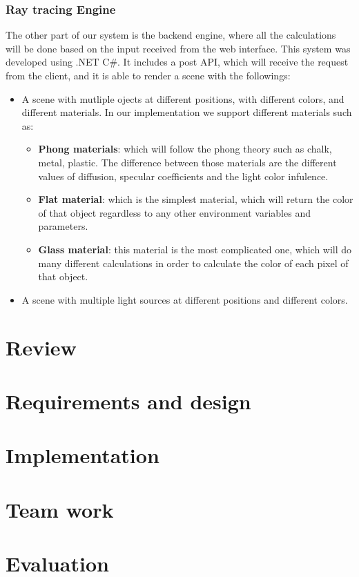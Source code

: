 \documentclass{article}
\begin{document}
	\subsubsection{Ray tracing Engine}
	The other part of our system is the backend engine, where all the calculations will be done based on the input received from the web interface. This system was developed using .NET C\#. It includes a post API, which will receive the request from the client, and it is able to render a scene with the followings:
	\begin{itemize}
		\item A scene with mutliple ojects at different positions, with different colors, and different materials. In our implementation we support different materials such as:
		\begin{itemize}
			\item \textbf{Phong materials}:  which will follow the phong theory such as chalk, metal, plastic. The difference between those materials are the different values of diffusion, specular coefficients and the light color infulence.
			\item \textbf{Flat material}: which is the simplest material, which will return the color of that object regardless to any other environment variables and parameters.
			\item \textbf {Glass material}: this material is the most complicated one, which will do many different calculations in order to calculate the color of each pixel of that object.
		\end{itemize}
	\item A scene with multiple light sources at different positions and different colors.
	\end{itemize}
	\section{Review}
	\section{Requirements and design}
	\section{Implementation}
	\section{Team work}
	\section{Evaluation}
	
	
	
	
\end{document}
